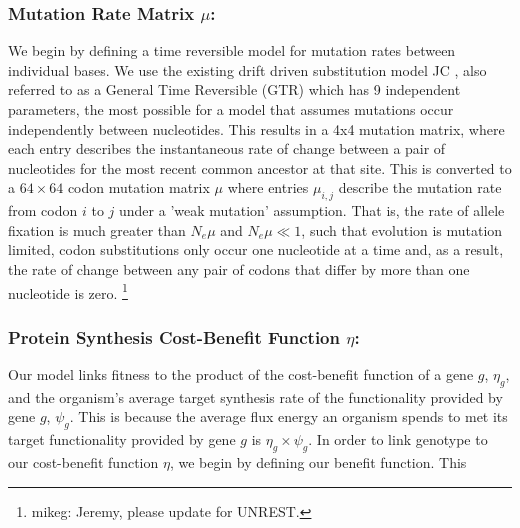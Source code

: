 \documentclass{article}
\newcommand{\Nemu}{\ensuremath{{N_e \mu}}\xspace} %
\newcommand{\etag}{\ensuremath{\eta_g}\xspace}
\newcommand{\muij}{\ensuremath{\mu_{i,j}}\xspace}
\newcommand{\psig}{\ensuremath{\psi_{g}}\xspace}
\begin{document}
\subsubsection*{Mutation Rate Matrix $\mu$: }
We begin by defining a time reversible model for mutation rates between individual bases.
We use the existing drift driven substitution model JC \citet{JukesAndCantor1969}, also referred to as a General Time Reversible (GTR) \citet{Tavare1986,Yang2014} which has 9 independent parameters, the most possible for a model that assumes mutations occur independently between nucleotides.
This results in a 4x4 mutation matrix, where each entry describes the instantaneous rate of change between a pair of nucleotides for the most recent common ancestor at that site.
This is converted to a $64 \times 64$ codon mutation matrix $\mu$ where entries $\muij$ describe the mutation rate from codon $i$ to $j$ under a 'weak mutation' assumption.
That is, the rate of allele fixation is much greater than \Nemu and $\Nemu \ll 1$, such that evolution is mutation limited, codon substitutions only occur one nucleotide at a time and, as a result,  the rate of change between any pair of codons that differ by more than one nucleotide is zero.
\footnote{mikeg: Jeremy, please update for UNREST.}

\subsubsection*{Protein Synthesis Cost-Benefit Function $\eta$: }
Our model links fitness to the product of the cost-benefit function of a gene $g$, $\etag$, and the organism's average target synthesis rate of the functionality provided by gene $g$, $\psig$.
This is because the average flux energy an organism spends to met its target functionality provided by gene $g$ is $\etag \times \psig$.
In order to link genotype to our cost-benefit function $\eta$, we begin by defining our benefit function.
This 
\end{document}
